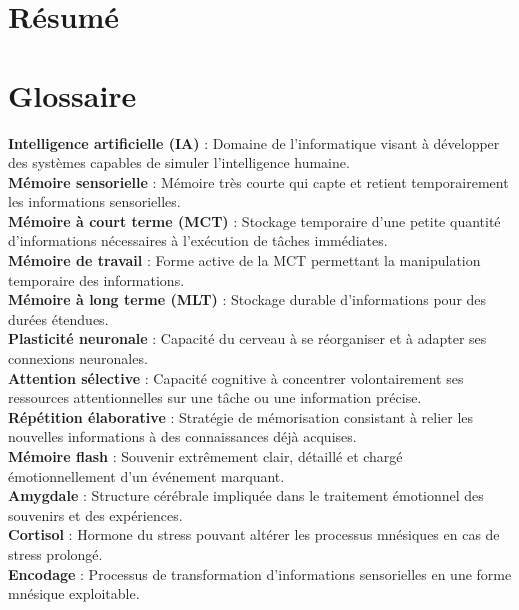 \documentclass[12pt,a4paper]{report}
\begin{document}
\chapter*{Résumé}

\tableofcontents

\listoffigures

\chapter*{Glossaire}

\textbf{Intelligence artificielle (IA)} : Domaine de l'informatique visant à développer des systèmes capables de simuler l'intelligence humaine.\\
\textbf{Mémoire sensorielle} : Mémoire très courte qui capte et retient temporairement les informations sensorielles.\\
\textbf{Mémoire à court terme (MCT)} : Stockage temporaire d'une petite quantité d'informations nécessaires à l'exécution de tâches immédiates.\\
\textbf{Mémoire de travail} : Forme active de la MCT permettant la manipulation temporaire des informations.\\
\textbf{Mémoire à long terme (MLT)} : Stockage durable d'informations pour des durées étendues.\\
\textbf{Plasticité neuronale} : Capacité du cerveau à se réorganiser et à adapter ses connexions neuronales.\\
\textbf{Attention sélective} : Capacité cognitive à concentrer volontairement ses ressources attentionnelles sur une tâche ou une information précise.\\
\textbf{Répétition élaborative} : Stratégie de mémorisation consistant à relier les nouvelles informations à des connaissances déjà acquises.\\
\textbf{Mémoire flash} : Souvenir extrêmement clair, détaillé et chargé émotionnellement d’un événement marquant.\\
\textbf{Amygdale} : Structure cérébrale impliquée dans le traitement émotionnel des souvenirs et des expériences.\\
\textbf{Cortisol} : Hormone du stress pouvant altérer les processus mnésiques en cas de stress prolongé.\\
\textbf{Encodage} : Processus de transformation d'informations sensorielles en une forme mnésique exploitable.\\
\end{document}
